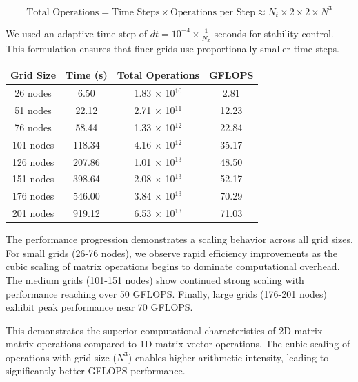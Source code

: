 \begin{equation}
\text{Total Operations} = \text{Time Steps} \times \text{Operations per Step} \approx N_t \times 2 \times 2 \times N^3
\end{equation}

We used an adaptive time step of $dt = 10^{-4} \times \frac{1}{N_{x}}$ seconds for stability control. This formulation ensures that finer grids use proportionally smaller time steps.

\vspace{0.5em}

\begin{table}[ht]
\centering
\begin{tabular*}{\linewidth}{@{\extracolsep{\fill}}cccc}
\toprule
\textbf{Grid Size} & \textbf{Time (s)} & \textbf{Total Operations} & \textbf{GFLOPS} \\
\midrule
26 nodes  & 6.50   & 1.83 $\times$ 10$^{10}$ & 2.81 \\
51 nodes  & 22.12  & 2.71 $\times$ 10$^{11}$ & 12.23 \\
76 nodes  & 58.44  & 1.33 $\times$ 10$^{12}$ & 22.84 \\
101 nodes & 118.34 & 4.16 $\times$ 10$^{12}$ & 35.17 \\
126 nodes & 207.86 & 1.01 $\times$ 10$^{13}$ & 48.50 \\
151 nodes & 398.64 & 2.08 $\times$ 10$^{13}$ & 52.17 \\
176 nodes & 546.00 & 3.84 $\times$ 10$^{13}$ & 70.29 \\
201 nodes & 919.12 & 6.53 $\times$ 10$^{13}$ & 71.03 \\
\bottomrule
\end{tabular*}
\end{table}


\vspace{1em}

The performance progression demonstrates a scaling behavior across all grid sizes. For small grids (26-76 nodes), we observe rapid efficiency improvements as the cubic scaling of matrix operations begins to dominate computational overhead. The medium grids (101-151 nodes) show continued strong scaling with performance reaching over 50 GFLOPS. Finally, large grids (176-201 nodes) exhibit peak performance near 70 GFLOPS.

This demonstrates the superior computational characteristics of 2D matrix-matrix operations compared to 1D matrix-vector operations. The cubic scaling of operations with grid size ($N^3$) enables higher arithmetic intensity, leading to significantly better GFLOPS performance.

